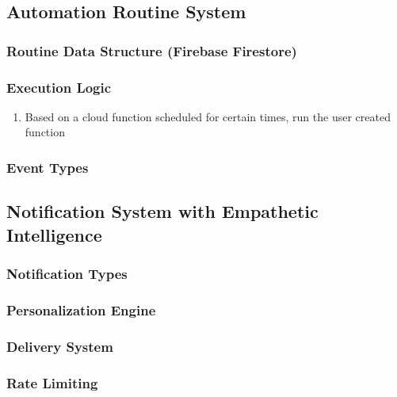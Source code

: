 \documentclass[conference]{IEEEtran}
\begin{document}
    \subsection{\textbf{Automation Routine System}}
        \subsubsection{Routine Data Structure (Firebase Firestore)}
        \subsubsection{Execution Logic}
            \begin{enumerate}
                \item Based on a cloud function scheduled for certain times, run the user created function
            \end{enumerate}
        \subsubsection{Event Types}
    \subsection{\textbf{Notification System with Empathetic Intelligence}}
        \subsubsection{Notification Types}
        \subsubsection{Personalization Engine}
        \subsubsection{Delivery System}
        \subsubsection{Rate Limiting}
\end{document}
